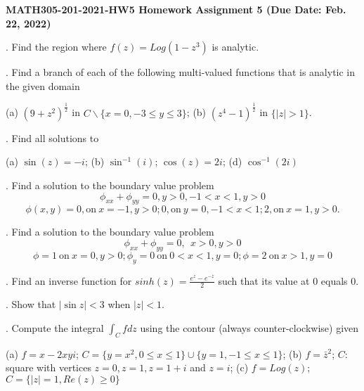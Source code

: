 %
%
\textwidth=6.8in
\textheight=8.8in
\oddsidemargin=-0.1in
\evensidemargin=-0.1in








\noindent
{\bf MATH305-201-2021-HW5 Homework Assignment 5 (Due Date: Feb. 22, 2022) }

\vskip 0.5cm

.  Find the region where $ f(z) =Log (1-z^3)$ is analytic.

\medskip


\medskip

. Find a branch of each of the following multi-valued functions that is analytic in the given domain

(a) $ (9+z^2)^{\frac{1}{2}}$ in $C \backslash \{ x=0,  -3\leq y \leq 3 \}$; (b) $ (z^4-1)^{\frac{1}{2}}$ in $ \{ |z|>1 \}$.


\medskip


. Find all solutions to

(a)  $ \sin (z)= -i$; (b) $ \sin^{-1} (i)$; $ \cos (z) = 2i $; (d) $ \cos^{-1} (2i)$

\medskip


. Find a solution to the boundary value problem 
$$ \phi_{xx}+ \phi_{yy}=0, y>0, -1 <x<1, y>0$$
$$ \phi(x, y)= 0, \mbox{on} \ x=-1, y>0 ; 0, \mbox{on}\  y=0,-1<x<1;  2, \mbox{on}\  x=1, y>0.
$$


\medskip

. Find a solution to the boundary value problem
$$ \phi_{xx}+\phi_{yy}=0,  \ \  x>0, y>0 $$
$$ \phi= 1 \ \mbox{on} \ x=0, y>0; \phi_y=0   \ \mbox{on} \  0<x<1, y=0; \phi=2 \ \mbox{on} \ x>1, y=0 $$


\medskip

. Find an inverse function for $ sinh (z)=\frac{e^z-e^{-z}}{2}$ such that its value at $0$ equals $0$.


\medskip

. Show that $|\sin z| < 3$ when $|z|<1$.

\medskip


. Compute the integral $ \int_{C} f dz$  using the contour (always counter-clockwise) given

(a) $ f= x-2xy i$; $ C=\{ y=x^2, 0\leq x \leq 1 \} \cup  \{ y=1, -1\leq x \leq 1 \} $; (b) $f=\bar{z}^2 $; $C$: square with vertices $ z=0, z=1, z=1+i$ and $ z=i$; (c) $ f=Log (z)$; $C=\{ |z|=1, Re(z) \geq 0 \}$



